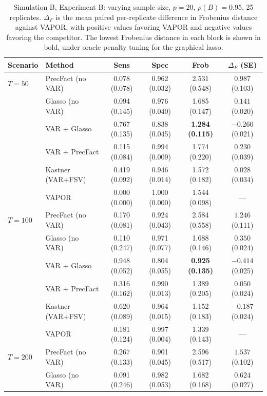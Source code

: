 \begin{table}[h!]
\centering
\small
\setlength{\tabcolsep}{4pt}
\caption{Simulation B, Experiment B: varying sample size, $p=20$, $\rho(B)=0.95$, 25 replicates. $\Delta_F$ is the mean paired per-replicate difference in Frobenius distance against VAPOR, with positive values favoring VAPOR and negative values favoring the competitor. The lowest Frobenius distance in each block is shown in bold, under oracle penalty tuning for the graphical lasso.}
\label{tab:sim-b-samplesize}
\begin{tabular}{llcccc}
\toprule
Scenario & Method & Sens & Spec & Frob & $\Delta_F$ (SE) \\
\midrule
$T = 50$   & PrecFact (no VAR)  & 0.078 (0.078) & 0.962 (0.032) & 2.531 (0.548) & $0.987$ (0.103) \\
           & Glasso (no VAR)    & 0.094 (0.145) & 0.976 (0.040) & 1.685 (0.147) & $0.141$ (0.020) \\
           & VAR + Glasso       & 0.767 (0.135) & 0.838 (0.045) & \textbf{1.284 (0.115)} & $-0.260$ (0.021) \\
           & VAR + PrecFact     & 0.115 (0.084) & 0.994 (0.009) & 1.774 (0.220) & $0.230$ (0.039) \\
           & Kastner (VAR+FSV)  & 0.419 (0.092) & 0.946 (0.014) & 1.572 (0.182) & $0.028$ (0.034) \\
           & VAPOR              & 0.000 (0.000) & 1.000 (0.000) & 1.544 (0.098) & --- \\
\midrule
$T = 100$  & PrecFact (no VAR)  & 0.170 (0.081) & 0.924 (0.043) & 2.584 (0.558) & $1.246$ (0.111) \\
           & Glasso (no VAR)    & 0.110 (0.247) & 0.971 (0.077) & 1.688 (0.146) & $0.350$ (0.024) \\
           & VAR + Glasso       & 0.948 (0.052) & 0.804 (0.055) & \textbf{0.925 (0.135)} & $-0.414$ (0.025) \\
           & VAR + PrecFact     & 0.316 (0.162) & 0.990 (0.013) & 1.389 (0.205) & $0.050$ (0.024) \\
           & Kastner (VAR+FSV)  & 0.620 (0.089) & 0.964 (0.015) & 1.152 (0.183) & $-0.187$ (0.024) \\
           & VAPOR              & 0.181 (0.124) & 0.997 (0.004) & 1.339 (0.143) & --- \\
\midrule
$T = 200$  & PrecFact (no VAR)  & 0.267 (0.133) & 0.901 (0.045) & 2.596 (0.517) & $1.537$ (0.102) \\
           & Glasso (no VAR)    & 0.091 (0.246) & 0.982 (0.053) & 1.682 (0.168) & $0.624$ (0.027) \\

\end{tabular}
\end{table}
